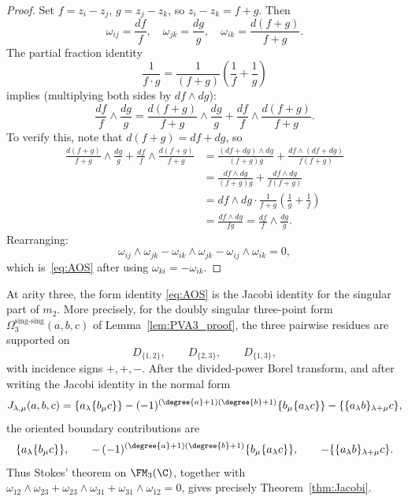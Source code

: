 \begin{proof}
Set $f = z_i - z_j$, $g = z_j - z_k$, so $z_i - z_k = f + g$. Then
\[
\omega_{ij} = \frac{df}{f}, \quad \omega_{jk} = \frac{dg}{g}, \quad \omega_{ik} = \frac{d(f+g)}{f+g}.
\]
The partial fraction identity
\[
\frac{1}{f \cdot g} = \frac{1}{(f+g)} \left(\frac{1}{f} + \frac{1}{g}\right)
\]
implies (multiplying both sides by $df \wedge dg$):
\[
\frac{df}{f} \wedge \frac{dg}{g} = \frac{d(f+g)}{f+g} \wedge \frac{dg}{g} + \frac{df}{f} \wedge \frac{d(f+g)}{f+g}.
\]
To verify this, note that $d(f+g) = df + dg$, so
\begin{align*}
\frac{d(f+g)}{f+g} \wedge \frac{dg}{g} + \frac{df}{f} \wedge \frac{d(f+g)}{f+g}
&= \frac{(df+dg) \wedge dg}{(f+g)g} + \frac{df \wedge (df+dg)}{f(f+g)} \\
&= \frac{df \wedge dg}{(f+g)g} + \frac{df \wedge dg}{f(f+g)} \\
&= df \wedge dg \cdot \frac{1}{f+g}\left(\frac{1}{g} + \frac{1}{f}\right) \\
&= \frac{df \wedge dg}{fg} = \frac{df}{f} \wedge \frac{dg}{g}.
\end{align*}
Rearranging:
\[
\omega_{ij} \wedge \omega_{jk} - \omega_{ik} \wedge \omega_{jk} - \omega_{ij} \wedge \omega_{ik} = 0,
\]
which is~\eqref{eq:AOS} after using $\omega_{ki} = -\omega_{ik}$.
\end{proof}

\begin{corollary}
\label{cor:arnold-pva-jacobi-residue}
At arity three, the form identity \eqref{eq:AOS} is the Jacobi
identity for the singular part of \(m_2\).  More precisely, for the
doubly singular three-point form
\(\Omega_3^{\mathrm{sing}\text{-}\mathrm{sing}}(a,b,c)\) of
Lemma~\ref{lem:PVA3_proof}, the three pairwise residues are supported
on
\[
D_{\{1,2\}},\qquad D_{\{2,3\}},\qquad D_{\{1,3\}},
\]
with incidence signs \(+,+,-\).  After the divided-power Borel
transform, and after writing the Jacobi identity in the normal form
\[
J_{\lambda,\mu}(a,b,c)
=
\{a_\lambda\{b_\mu c\}\}
-
(-1)^{(\degree{a}+1)(\degree{b}+1)}
\{b_\mu\{a_\lambda c\}\}
-
\{\{a_\lambda b\}_{\lambda+\mu}c\},
\]
the oriented boundary contributions are
\[
\{a_\lambda\{b_\mu c\}\},\qquad
-\,(-1)^{(\degree{a}+1)(\degree{b}+1)}
\{b_\mu\{a_\lambda c\}\},\qquad
-\{\{a_\lambda b\}_{\lambda+\mu}c\}.
\]
Thus Stokes' theorem on \(\FM_3(\C)\), together with
\(\omega_{12}\wedge\omega_{23}
+\omega_{23}\wedge\omega_{31}
+\omega_{31}\wedge\omega_{12}=0\), gives precisely
Theorem~\ref{thm:Jacobi}.
\end{corollary}

